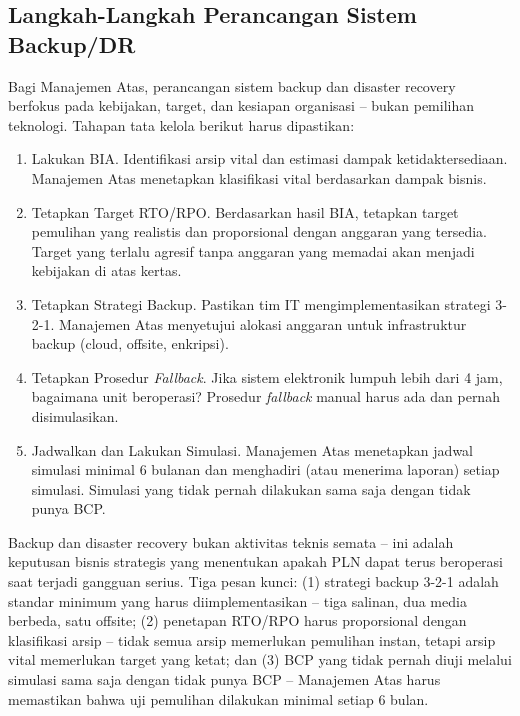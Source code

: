 \documentclass[12pt,a4paper]{report}
\begin{document}
\subsection{Langkah-Langkah Perancangan Sistem Backup/DR}
Bagi Manajemen Atas, perancangan sistem backup dan disaster recovery berfokus pada kebijakan, target, dan kesiapan organisasi -- bukan pemilihan teknologi. Tahapan tata kelola berikut harus dipastikan:

\begin{enumerate}[leftmargin=*]
    \item Lakukan BIA. Identifikasi arsip vital dan estimasi dampak ketidaktersediaan. Manajemen Atas menetapkan klasifikasi vital berdasarkan dampak bisnis.
    \item Tetapkan Target RTO/RPO. Berdasarkan hasil BIA, tetapkan target pemulihan yang realistis dan proporsional dengan anggaran yang tersedia. Target yang terlalu agresif tanpa anggaran yang memadai akan menjadi kebijakan di atas kertas.
    \item Tetapkan Strategi Backup. Pastikan tim IT mengimplementasikan strategi 3-2-1. Manajemen Atas menyetujui alokasi anggaran untuk infrastruktur backup (cloud, offsite, enkripsi).
    \item Tetapkan Prosedur \textit{Fallback}. Jika sistem elektronik lumpuh lebih dari 4 jam, bagaimana unit beroperasi? Prosedur \textit{fallback} manual harus ada dan pernah disimulasikan.
    \item Jadwalkan dan Lakukan Simulasi. Manajemen Atas menetapkan jadwal simulasi minimal 6 bulanan dan menghadiri (atau menerima laporan) setiap simulasi. Simulasi yang tidak pernah dilakukan sama saja dengan tidak punya BCP.
\end{enumerate}

\begin{plnbox}
Backup dan disaster recovery bukan aktivitas teknis semata -- ini adalah keputusan bisnis strategis yang menentukan apakah PLN dapat terus beroperasi saat terjadi gangguan serius. Tiga pesan kunci: (1) strategi backup 3-2-1 adalah standar minimum yang harus diimplementasikan -- tiga salinan, dua media berbeda, satu offsite; (2) penetapan RTO/RPO harus proporsional dengan klasifikasi arsip -- tidak semua arsip memerlukan pemulihan instan, tetapi arsip vital memerlukan target yang ketat; dan (3) BCP yang tidak pernah diuji melalui simulasi sama saja dengan tidak punya BCP -- Manajemen Atas harus memastikan bahwa uji pemulihan dilakukan minimal setiap 6 bulan.
\end{plnbox}
\end{document}
